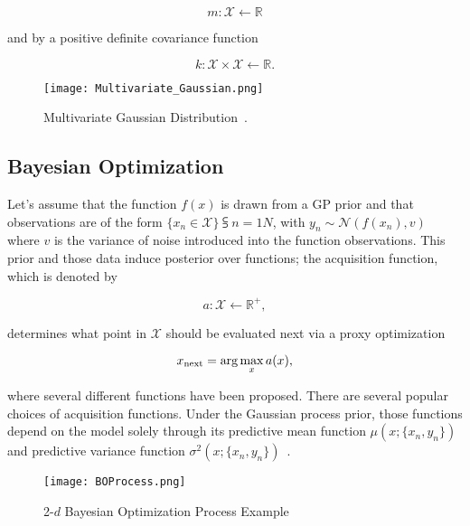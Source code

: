 \begin{equation}
	m : \mathcal{X} \leftarrow \mathbb{R}
\end{equation}

and by a positive definite covariance function 

\begin{equation}
	k : \mathcal{X} \times \mathcal{X} \leftarrow \mathbb{R}.
\end{equation}

\begin{figure} [h!]
	\centering
	\texttt{[image: Multivariate\_Gaussian.png]}
	\caption{Multivariate Gaussian Distribution~\cite{MNDWikipedia}.}
	\label{fig:Multivatiate_Gaussian}
\end{figure}

\subsection{Bayesian Optimization} Let's assume that the function $f(x)$ is drawn from a GP prior and that observations are of the form $\{x_n \in \mathcal{X}\}\subsup{}{ n=1}{N}$, with $y_n \sim \mathcal{N}(f(x_n), v)$ where $v$ is the variance of noise introduced into the function observations. This prior and those data induce  posterior over functions; the acquisition function, which is denoted by

\begin{equation}
	a : \mathcal{X} \leftarrow \mathbb{R}^+,
\end{equation}

determines what point in $\mathcal{X}$ should be evaluated next via a proxy optimization

\begin{equation}
	x\textsubscript{next} = \arg\max_{x}a(x),
\end{equation}

where several different functions have been proposed. There are several popular choices of acquisition functions. Under the Gaussian process prior, those functions depend on the model solely through its predictive mean function $\mu(x; \{x_n, y_n\})$ and predictive variance function $\sigma^2(x; \{x_n, y_n\})$~\cite{NIPS2012_4522}. 


\begin{figure} [h!]
	\centering
	\texttt{[image: BOProcess.png]}
	\caption{2-$d$ Bayesian Optimization Process Example~\cite{BayesianOptimizationImage}}
	\label{fig:BoProcess}
\end{figure}

